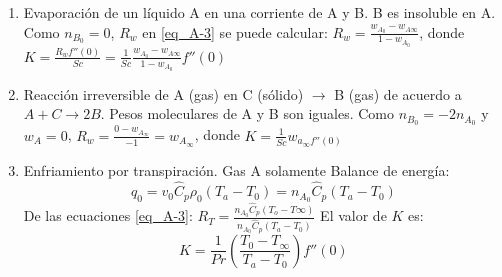 \begin{enumerate}
    \item Evaporación de un líquido A en una corriente de A y B. B es insoluble en A. \newline
    Como $n_{B_0}=0$, $R_w$ en \eqref{eq_A-3} se puede calcular: $R_w=\frac{w_{A_0}-w_{A\infty}}{1-w_{A_0}}$, donde $K=\frac{R_w f''(0)}{Sc}=\frac{1}{Sc}\frac{w_{A_0}-w_{A\infty}}{1-w_{A_0}}f''(0)$
    \item Reacción irreversible de A (gas) en C (sólido) $\to$ B (gas) de acuerdo a $A+C\to 2B$. Pesos moleculares de A y B son iguales. Como $n_{B_0}=-2n_{A_0}$ y $w_A=0$, $R_w=\frac{0-w_{A_\infty}}{-1}=w_{A_\infty}$, donde $K=\frac{1}{Sc}w_{a_\infty f''(0)}$
    \item Enfriamiento por transpiración. Gas A solamente
    \newline 
    Balance de energía:
    \begin{equation*}
        q_0=v_0\hat{C}_p\rho_0(T_a-T_0 )=n_{A_0}\hat{C}_p(T_a-T_0)
    \end{equation*}
    De las ecuaciones \eqref{eq_A-3}: $R_T=\frac{n_{A_0}\hat{C}_p(T_o-T\infty)}{n_{A_0}\hat{C}_p(T_a-T_0)}$
    \newline
    El valor de \( K \) es: \[ K = \frac{1}{Pr} \left( \frac{T_0 - T_\infty}{T_a - T_0} \right) f''(0) \]
\end{enumerate}

